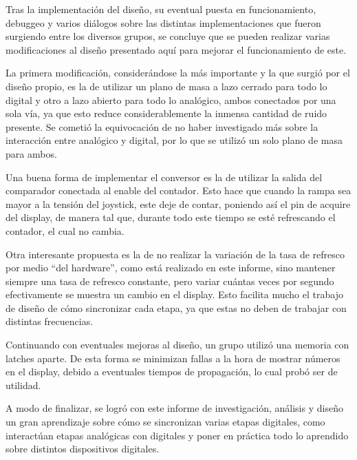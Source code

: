 Tras la implementación del diseño, su eventual puesta en funcionamiento, debuggeo y varios diálogos sobre las distintas implementaciones que fueron surgiendo entre los diversos grupos, se concluye que se pueden realizar varias modificaciones al diseño presentado aquí para mejorar el funcionamiento de este.

La primera modificación, considerándose la más importante y la que surgió por el diseño propio, es la de utilizar un plano de masa a lazo cerrado para todo lo digital y otro a lazo abierto para todo lo analógico, ambos conectados por una sola vía, ya que esto reduce considerablemente la inmensa cantidad de ruido presente. Se cometió la equivocación de no haber investigado más sobre la interacción entre analógico y digital, por lo que se utilizó un solo plano de masa para ambos.

Una buena forma de implementar el conversor es la de utilizar la salida del comparador conectada al enable del contador. Esto hace que cuando la rampa sea mayor a la tensión del joystick, este deje de contar, poniendo así el pin de acquire del display, de manera tal que, durante todo este tiempo se esté refrescando el contador, el cual no cambia.

Otra interesante propuesta es la de no realizar la variación de la tasa de refresco por medio ``del hardware'', como está realizado en este informe, sino mantener siempre una tasa de refresco constante, pero variar cuántas veces por segundo efectivamente se muestra un cambio en el display. Esto facilita mucho el trabajo de diseño de cómo sincronizar cada etapa, ya que estas no deben de trabajar con distintas frecuencias.

Continuando con eventuales mejoras al diseño, un grupo utilizó una memoria con latches aparte. De esta forma se minimizan fallas a la hora de mostrar números en el display, debido a eventuales tiempos de propagación, lo cual probó ser de utilidad.

A modo de finalizar, se logró con este informe de investigación, análisis y diseño un gran aprendizaje sobre cómo se sincronizan varias etapas digitales, como interactúan etapas analógicas con digitales y poner en práctica todo lo aprendido sobre distintos dispositivos digitales.

